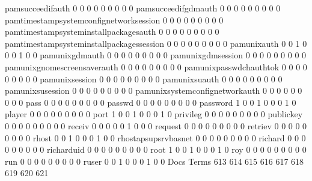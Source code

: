\documentclass[compress,8pt]{beamer}
\begin{document}
\begin{frame}
\begin{Schunk}
  pamsucceedifauth                           0   0   0   0   0   0   0   0   0
  pamsucceedifgdmauth                        0   0   0   0   0   0   0   0   0
  pamtimestampsystemconfignetworksession     0   0   0   0   0   0   0   0   0
  pamtimestampsysteminstallpackagesauth      0   0   0   0   0   0   0   0   0
  pamtimestampsysteminstallpackagessession   0   0   0   0   0   0   0   0   0
  pamunixauth                                0   0   1   0   0   0   1   0   0
  pamunixgdmauth                             0   0   0   0   0   0   0   0   0
  pamunixgdmsession                          0   0   0   0   0   0   0   0   0
  pamunixgnomescreensaverauth                0   0   0   0   0   0   0   0   0
  pamunixpasswdchauthtok                     0   0   0   0   0   0   0   0   0
  pamunixsession                             0   0   0   0   0   0   0   0   0
  pamunixsuauth                              0   0   0   0   0   0   0   0   0
  pamunixsusession                           0   0   0   0   0   0   0   0   0
  pamunixsystemconfignetworkauth             0   0   0   0   0   0   0   0   0
  pass                                       0   0   0   0   0   0   0   0   0
  passwd                                     0   0   0   0   0   0   0   0   0
  password                                   1   0   0   1   0   0   0   1   0
  player                                     0   0   0   0   0   0   0   0   0
  port                                       1   0   0   1   0   0   0   1   0
  privileg                                   0   0   0   0   0   0   0   0   0
  publickey                                  0   0   0   0   0   0   0   0   0
  receiv                                     0   0   0   0   0   1   0   0   0
  request                                    0   0   0   0   0   0   0   0   0
  retriev                                    0   0   0   0   0   0   0   0   0
  rhost                                      0   0   1   0   0   0   1   0   0
  rhostapsupsrvbasnet                        0   0   0   0   0   0   0   0   0
  richard                                    0   0   0   0   0   0   0   0   0
  richarduid                                 0   0   0   0   0   0   0   0   0
  root                                       1   0   0   1   0   0   0   1   0
  roy                                        0   0   0   0   0   0   0   0   0
  run                                        0   0   0   0   0   0   0   0   0
  ruser                                      0   0   1   0   0   0   1   0   0
                                          Docs
Terms                                      613 614 615 616 617 618 619 620 621

\end{Schunk}
\end{frame}
\end{document}
